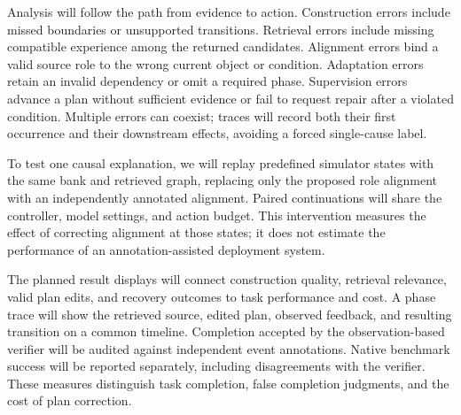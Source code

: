 Analysis will follow the path from evidence to action. Construction errors include missed boundaries or unsupported transitions. Retrieval errors include missing compatible experience among the returned candidates. Alignment errors bind a valid source role to the wrong current object or condition. Adaptation errors retain an invalid dependency or omit a required phase. Supervision errors advance a plan without sufficient evidence or fail to request repair after a violated condition. Multiple errors can coexist; traces will record both their first occurrence and their downstream effects, avoiding a forced single-cause label.

To test one causal explanation, we will replay predefined simulator states with the same bank and retrieved graph, replacing only the proposed role alignment with an independently annotated alignment. Paired continuations will share the controller, model settings, and action budget. This intervention measures the effect of correcting alignment at those states; it does not estimate the performance of an annotation-assisted deployment system.

The planned result displays will connect construction quality, retrieval relevance, valid plan edits, and recovery outcomes to task performance and cost. A phase trace will show the retrieved source, edited plan, observed feedback, and resulting transition on a common timeline. Completion accepted by the observation-based verifier will be audited against independent event annotations. Native benchmark success will be reported separately, including disagreements with the verifier. These measures distinguish task completion, false completion judgments, and the cost of plan correction.

